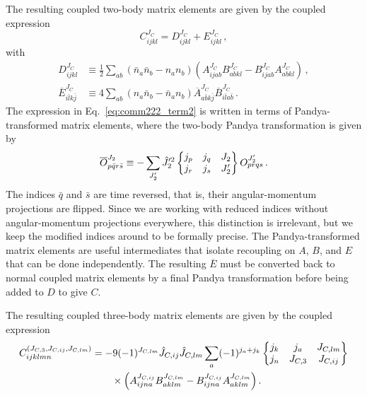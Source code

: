 The resulting coupled two-body matrix elements are given by the coupled expression
\begin{equation}
  C^{J_C}_{ijkl}
  =
  D^{J_C}_{ijkl}
  + E^{J_C}_{ijkl}\,,
\end{equation}
with
\begin{align}
  D^{J_C}_{ijkl}                        & \equiv \frac{1}{2} \sum_{ab}
  (\bar{n}_a \bar{n}_b - n_a n_b)
  \left(
  A_{ijab}^{J_C} B_{abkl}^{J_C} - B_{ijab}^{J_C} A_{abkl}^{J_C}
  \right)\,,                                                           \\
  \overline{E}_{i\bar{l}k\bar{j}}^{J_C} & \equiv 4 \sum_{ab}
  (n_a \bar{n}_b - \bar{n}_a n_b)
  \overline{A}_{a\bar{b}k\bar{j}}^{J_C}
  \overline{B}_{i\bar{l}a\bar{b}}^{J_C}\,. \label{eq:comm222_term2}
\end{align}
The expression in Eq.~\eqref{eq:comm222_term2} is written
in terms of Pandya-transformed matrix elements,
where the two-body Pandya transformation is given by~\cite{Pand56pandya}
\begin{equation}
  \overline{O}_{p\bar{q}r\bar{s}}^{J_{2}} \equiv
  - \sum_{J_{2}'}
  \hat{J}_{2}^{\prime 2}
  \sixj{j_p}{j_q}{J_{2}}{j_r}{j_s}{J_{2}'}
  O_{prqs}^{J_{2}'}\,.
\end{equation}
The indices $\bar{q}$ and $\bar{s}$ are time reversed,
that is, their angular-momentum projections are flipped.
Since we are working with reduced indices
without angular-momentum projections everywhere,
this distinction is irrelevant,
but we keep the modified indices around to be formally precise.
The Pandya-transformed matrix elements
are useful intermediates that isolate recoupling on $A$, $B$, and $E$
that can be done independently.
The resulting $\overline{E}$ must be
converted back to normal coupled matrix elements
by a final Pandya transformation
before being added to $D$ to give $C$.

The resulting coupled three-body matrix elements are given by the coupled expression
\begin{equation}
  \begin{split}
    C_{ijklmn}^{(J_{C,3}, J_{C,ij}, J_{C,lm})} & =
    -9 (-1)^{J_{C,lm}} \hat{J}_{C,ij} \hat{J}_{C,lm}
    \sum_{a} (-1)^{j_a + j_k}
    \sixj{j_k}{j_a}{J_{C,lm}}{j_{n}}{J_{C,3}}{J_{C,ij}} \\
    & \quad \quad \times \left(
    A_{ijna}^{J_{C,ij}} B_{aklm}^{J_{C,lm}}
    - B_{ijna}^{J_{C,ij}} A_{aklm}^{J_{C,lm}}
    \right).
  \end{split}
\end{equation}

